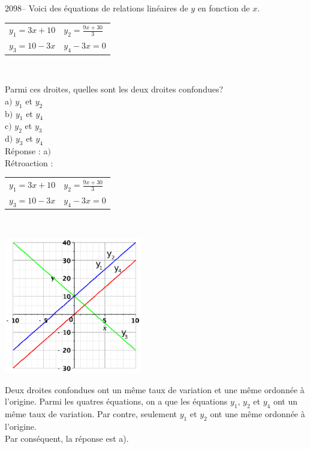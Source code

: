 \documentclass[letterpaper, 12pt]{article}
\begin{document}
2098-- Voici des \'equations de relations lin\'eaires de $y$ en fonction de $x$.
\begin{center}
\begin{tabular}{l l}
 $ y_{1}=3x+10 $ &  $ y_{2}=\frac{9x+30}{3} $ \\
 $ y_{3}=10-3x $ &  $ y_{4}-3x=0 $ \\
\end{tabular}\\
\end{center}
Parmi ces droites, quelles sont les deux droites confondues? \\

a$)$ $ y_{1}$ et $ y_{2}$\\
b$)$ $ y_{1}$ et $ y_{4}$\\
c$)$ $ y_{2}$ et $ y_{3}$\\
d$)$ $ y_{3}$ et $ y_{4}$\\

R\'eponse : a$)$\\

R\'etroaction :\\
\begin{center}
\begin{tabular}{l l}
 $ y_{1}=3x+10 $ &  $ y_{2}=\frac{9x+30}{3} $ \\
 $ y_{3}=10-3x $ &  $ y_{4}-3x=0 $ \\
\end{tabular}\\
\end{center}
\begin{center}
 \includegraphics[width=6cm,bb=14 14 215 215]{Q2098.eps}
\end{center}
Deux droites confondues ont un m\^eme taux de variation et une m\^eme ordonn\'ee \`a l'origine. Parmi les quatres \'equations, on a que les \'equations $ y_{1}$, $ y_{2}$ et $ y_{4}$ ont un m\^eme taux de variation. Par contre, seulement $ y_{1}$ et $ y_{2}$ ont une m\^eme ordonn\'ee \`a l'origine.\\
Par cons\'equent, la r\'eponse est a).\\
\end{document}
